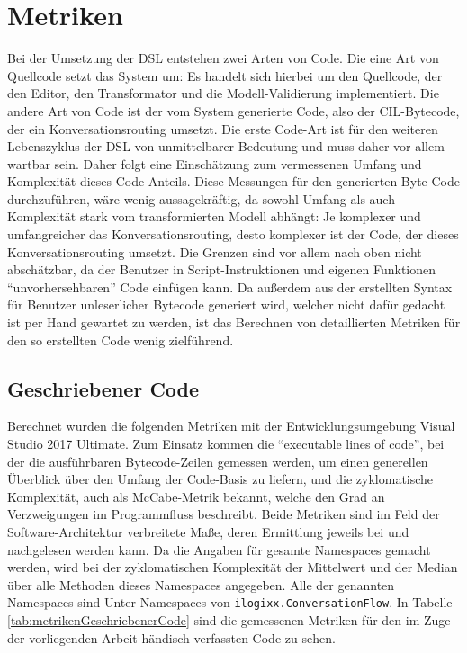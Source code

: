 \section{Metriken}
Bei der Umsetzung der DSL entstehen zwei Arten von Code. Die eine Art von Quellcode setzt das System um: Es handelt sich hierbei um den Quellcode, der den Editor, den Transformator und die Modell-Validierung implementiert. Die andere Art von Code ist der vom System generierte Code, also der CIL-Bytecode, der ein Konversationsrouting umsetzt. Die erste Code-Art ist für den weiteren Lebenszyklus der DSL von unmittelbarer Bedeutung und muss daher vor allem wartbar sein. Daher folgt eine Einschätzung zum vermessenen Umfang und Komplexität dieses Code-Anteils. Diese Messungen für den generierten Byte-Code durchzuführen, wäre  wenig aussagekräftig, da sowohl Umfang als auch Komplexität stark vom transformierten Modell abhängt: Je komplexer und umfangreicher das Konversationsrouting, desto komplexer ist der Code, der dieses Konversationsrouting umsetzt. Die Grenzen sind vor allem nach oben nicht abschätzbar, da der Benutzer in Script-Instruktionen und eigenen Funktionen ``unvorhersehbaren'' Code einfügen kann. Da außerdem aus der erstellten Syntax für Benutzer unleserlicher Bytecode generiert wird, welcher nicht dafür gedacht ist per Hand gewartet zu werden, ist das Berechnen von detaillierten Metriken für den so erstellten Code wenig zielführend. 

\subsection{Geschriebener Code}
Berechnet wurden die folgenden Metriken mit der Entwicklungsumgebung Visual Studio 2017 Ultimate. Zum Einsatz kommen die ``executable lines of code'', bei der die ausführbaren Bytecode-Zeilen gemessen werden, um einen generellen Überblick über den Umfang der Code-Basis zu liefern, und die zyklomatische Komplexität, auch als McCabe-Metrik bekannt, welche den Grad an Verzweigungen im Programmfluss beschreibt. Beide Metriken sind im Feld der Software-Architektur verbreitete Maße, deren Ermittlung jeweils bei \cite[S. 35ff]{Laird:06} und \cite[S. 58ff]{Laird:06} nachgelesen werden kann. Da die Angaben für gesamte Namespaces gemacht werden, wird bei der zyklomatischen Komplexität der Mittelwert und der Median über alle Methoden dieses Namespaces angegeben. Alle der genannten Namespaces sind Unter-Namespaces von \texttt{ilogixx.ConversationFlow}. In Tabelle \ref{tab:metrikenGeschriebenerCode} sind die gemessenen Metriken für den im Zuge der vorliegenden Arbeit händisch verfassten Code zu sehen.

